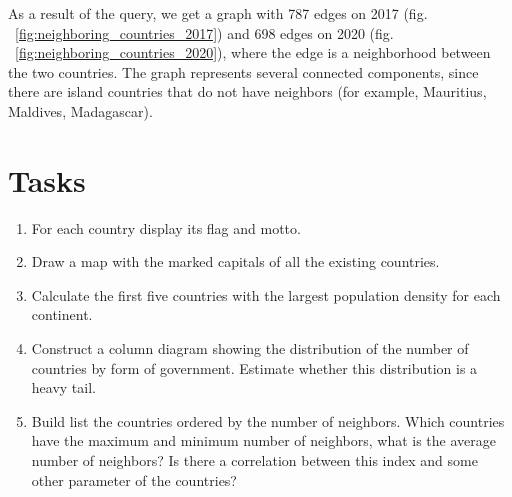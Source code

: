 As a result of the query, we get a graph with 787 edges on 2017 (fig. ~\ref{fig:neighboring_countries_2017}) and 698 edges on 2020 (fig. ~\ref{fig:neighboring_countries_2020}), where the edge is a neighborhood between the two countries. The graph represents several connected components, since there are island countries that do not have neighbors (for example, Mauritius, Maldives, Madagascar).

\section{Tasks}
\begin{enumerate}
	\item For each country display its flag and motto.
	\item Draw a map with the marked capitals of all the existing countries.
	\item Calculate the first five countries with the largest population density for each continent.
	\item Construct a column diagram showing the distribution of the number of countries by form of government. Estimate whether this distribution is a heavy tail.
	\item Build list the countries ordered by the number of neighbors. Which countries have the maximum and minimum number of neighbors, what is the average number of neighbors? Is there a correlation between this index and some other parameter of the countries?
\end{enumerate}
